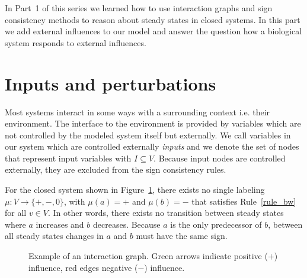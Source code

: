 In Part~1 of this series we learned how to use interaction graphs and sign consistency methods
 to reason about steady states in closed systems.
In this part we add external influences to our model and answer the question
 how a biological system responds to external influences.


\section*{Inputs and perturbations}

Most systems interact in some ways with a surrounding context i.e. their environment.
The interface to the environment is provided by variables which are not controlled by the modeled system itself but externally.
We call variables in our system which are controlled externally \emph{inputs} and
 we denote the set of nodes that represent input variables with $I \subseteq V$.
Because input nodes are controlled externally, they are excluded from the sign consistency rules.

For the closed system shown in Figure~\ref{fig:ig},
 there exists no single labeling $\mu: V \rightarrow \{\plus, \minus, 0\}$,
 with $\mu(a)=\plus$ and $\mu(b)=\minus$ that satisfies Rule~\ref{rule_bw} for all $v \in V$.
%
In other words, there exists no transition between steady states where $a$ increases and $b$ decreases.
Because $a$ is the only predecessor of $b$, between all steady states changes in $a$ and $b$ must have the same sign.

\begin{figure}
  \centering
  \caption{Example of an interaction graph. Green arrows indicate positive ($\plus$) influence,
    red edges negative ($\minus$) influence.
  } 
  \label{fig:ig}
\end{figure}

